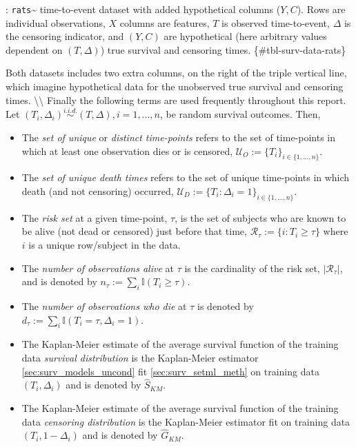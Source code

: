 \documentclass[
  letterpaper,
]{scrbook}
\providecommand{\tightlist}{%
  \setlength{\itemsep}{0pt}\setlength{\parskip}{0pt}}\usepackage{longtable,booktabs,array}
\theoremstyle{plain}
\theoremstyle{definition}
\theoremstyle{remark}
\begin{document}
: \texttt{rats}\textasciitilde{}\cite{pkgsurvival} time-to-event dataset
with added hypothetical columns (\(Y,C\)). Rows are individual
observations, \(X\) columns are features, \(T\) is observed
time-to-event, \(\Delta\) is the censoring indicator, and \((Y,C)\) are
hypothetical (here arbitrary values dependent on \((T,\Delta)\)) true
survival and censoring times. \{\#tbl-surv-data-rats\}

Both datasets includes two extra columns, on the right of the triple
vertical line, which imagine hypothetical data for the unobserved true
survival and censoring times. \textbackslash\textbackslash{} Finally the
following terms are used frequently throughout this report. Let
\((T_i, \Delta_i) \stackrel{i.i.d.}\sim(T,\Delta), i = 1,...,n\), be
random survival outcomes. Then,

\begin{itemize}
\tightlist
\item
  The \emph{set of unique} or \emph{distinct time-points} refers to the
  set of time-points in which at least one observation dies or is
  censored, \(\mathcal{U}_O := \{T_i\}_{i \in \{1,...,n\}}\).
\item
  The \emph{set of unique death times} refers to the set of unique
  time-points in which death (and not censoring) occurred,
  \(\mathcal{U}_D := \{T_i : \Delta_i = 1\}_{i \in \{1,...,n\}}\).
\item
  The \emph{risk set} at a given time-point, \(\tau\), is the set of
  subjects who are known to be alive (not dead or censored) just before
  that time, \(\mathcal{R}_\tau := \{i: T_i \geq \tau\}\) where \(i\) is
  a unique row/subject in the data.
\item
  The \emph{number of observations alive} at \(\tau\) is the cardinality
  of the risk set, \(|\mathcal{R}_\tau|\), and is denoted by
  \(n_\tau := \sum_i \mathbb{I}(T_i \geq \tau)\).
\item
  The \emph{number of observations who die} at \(\tau\) is denoted by
  \(d_\tau := \sum_i \mathbb{I}(T_i = \tau, \Delta_i = 1)\).
\item
  The Kaplan-Meier estimate of the average survival function of the
  training data \emph{survival distribution} is the Kaplan-Meier
  estimator \ref{sec:surv_models_uncond} fit \ref{sec:surv_setml_meth}
  on training data \((T_i, \Delta_i)\) and is denoted by
  \(\hat{S}_{KM}\).
\item
  The Kaplan-Meier estimate of the average survival function of the
  training data \emph{censoring distribution} is the Kaplan-Meier
  estimator fit on training data \((T_i, 1 - \Delta_i)\) and is denoted
  by \(\hat{G}_{KM}\).
\end{itemize}
\end{document}
